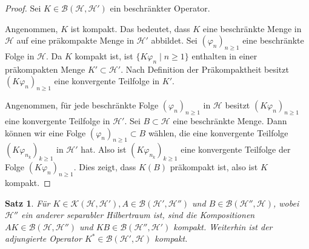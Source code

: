\documentclass[11pt, hidelinks]{article}
\newcommand{\h}{\mathcal{H}}
\numberwithin{conj}{section}
\newtheorem{theorem}[conj]{Satz}
\begin{document}
\begin{proof}
Sei $K \in \mathcal{B}(\h,\h')$ ein beschränkter Operator.

Angenommen, $K$ ist kompakt. Das bedeutet, dass $K$ eine beschränkte Menge in $\h$ auf eine präkompakte Menge in $\h'$ abbildet. Sei $(\varphi_n)_{n \geq 1}$ eine beschränkte Folge in $\h$. Da $K$ kompakt ist, ist $\{K\varphi_n \; \vert \; n \geq 1\}$ enthalten in einer präkompakten Menge $K' \subset \h'$. Nach Definition der Präkompaktheit besitzt $(K\varphi_n)_{n \geq 1}$ eine konvergente Teilfolge in $K'$.

Angenommen, für jede beschränkte Folge $(\varphi_n)_{n \geq 1}$ in $\h$ besitzt $(K\varphi_n)_{n \geq 1}$ eine konvergente Teilfolge in $\h'$. Sei $B \subset \h$ eine beschränkte Menge. Dann können wir eine Folge $(\varphi_n)_{n \geq 1} \subset B$ wählen, die eine konvergente Teilfolge $(K\varphi_{n_k})_{k \geq 1}$ in $\h'$ hat. Also ist $(K\varphi_{n_k})_{k \geq 1}$ eine konvergente Teilfolge der Folge $(K\varphi_{n})_{n \geq 1}$. Dies zeigt, dass $K(B)$ präkompakt ist, also ist $K$ kompakt.
\end{proof}

\begin{theorem}
    \label{schauder}
    Für $K \in \mathcal{K}(\h,\h'), A \in \mathcal{B}(\h',\h'')$ und $B \in \mathcal{B}(\h'',\h)$, wobei $\h''$ ein anderer separabler Hilbertraum ist, sind die Kompositionen $AK \in \mathcal{B}(\h,\h'')$ und $KB \in \mathcal{B}(\h'',\h')$ kompakt. Weiterhin ist der adjungierte Operator $K^\ast \in \mathcal{B}(\h',\h)$ kompakt.
\end{theorem}
\end{document}
